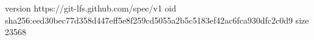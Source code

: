 version https://git-lfs.github.com/spec/v1
oid sha256:eed30bec77d358d447eff5e8f259cd5055a2b5c5183ef42ac6fca930dfc2c0d9
size 23568
